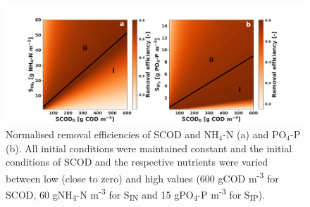 \begin{figure}[H]
    \hspace*{-2cm} 
    \includegraphics[width=1.25\linewidth]{./Chap2/simulations/ch2_sin_cod.pdf}
    \caption{Normalised removal efficiencies of SCOD and $\mathrm{NH_4\mbox{-}N}$ (a) and $\mathrm{PO_4\mbox{-}P}$ (b). All initial conditions were maintained constant and the initial conditions of SCOD and the respective nutrients were varied between low (close to zero) and high values (600 gCOD m\textsuperscript{-3} for SCOD, 60 gNH\textsubscript{4}-N m\textsuperscript{-3} for S\textsubscript{IN} and 15 gPO\textsubscript{4}-P m\textsuperscript{-3} for S\textsubscript{IP}).}
    \label{fig:ch2_cnp}
\end{figure}


